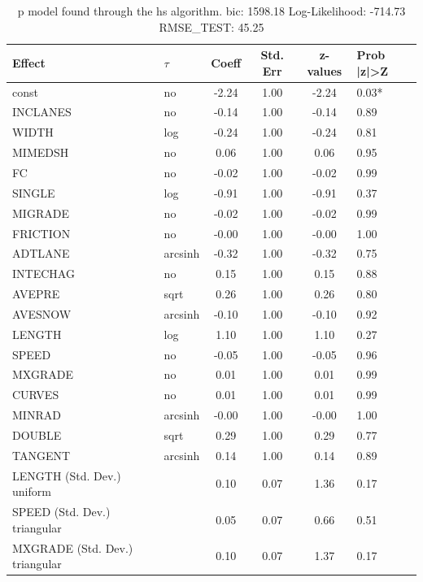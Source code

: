 \begin{table}
	\caption{p model found through the hs algorithm. bic: 1598.18 Log-Likelihood: -714.73 RMSE_TEST: 45.25}
	\begin{center}
		\begin{tabular}{|l|l|c|c|c|l|}
			\hline
			Effect & $\tau$ & Coeff & Std. Err & z-values & Prob |z|>Z \\
			\hline
			const & no & -2.24 & 1.00 & -2.24 & 0.03* \\
			\hline
			INCLANES & no & -0.14 & 1.00 & -0.14 & 0.89 \\
			\hline
			WIDTH & log & -0.24 & 1.00 & -0.24 & 0.81 \\
			\hline
			MIMEDSH & no & 0.06 & 1.00 & 0.06 & 0.95 \\
			\hline
			FC & no & -0.02 & 1.00 & -0.02 & 0.99 \\
			\hline
			SINGLE & log & -0.91 & 1.00 & -0.91 & 0.37 \\
			\hline
			MIGRADE & no & -0.02 & 1.00 & -0.02 & 0.99 \\
			\hline
			FRICTION & no & -0.00 & 1.00 & -0.00 & 1.00 \\
			\hline
			ADTLANE & arcsinh & -0.32 & 1.00 & -0.32 & 0.75 \\
			\hline
			INTECHAG & no & 0.15 & 1.00 & 0.15 & 0.88 \\
			\hline
			AVEPRE & sqrt & 0.26 & 1.00 & 0.26 & 0.80 \\
			\hline
			AVESNOW & arcsinh & -0.10 & 1.00 & -0.10 & 0.92 \\
			\hline
			LENGTH & log & 1.10 & 1.00 & 1.10 & 0.27 \\
			\hline
			SPEED & no & -0.05 & 1.00 & -0.05 & 0.96 \\
			\hline
			MXGRADE & no & 0.01 & 1.00 & 0.01 & 0.99 \\
			\hline
			CURVES & no & 0.01 & 1.00 & 0.01 & 0.99 \\
			\hline
			MINRAD & arcsinh & -0.00 & 1.00 & -0.00 & 1.00 \\
			\hline
			DOUBLE & sqrt & 0.29 & 1.00 & 0.29 & 0.77 \\
			\hline
			TANGENT & arcsinh & 0.14 & 1.00 & 0.14 & 0.89 \\
			\hline
			LENGTH (Std. Dev.) uniform &  & 0.10 & 0.07 & 1.36 & 0.17 \\
			\hline
			SPEED (Std. Dev.) triangular &  & 0.05 & 0.07 & 0.66 & 0.51 \\
			\hline
			MXGRADE (Std. Dev.) triangular &  & 0.10 & 0.07 & 1.37 & 0.17 \\

\end{tabular}
\end{center}
\end{table}
